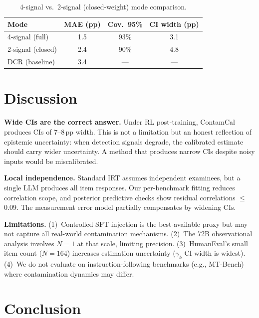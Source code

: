 \documentclass[letterpaper]{article}
\begin{document}
\begin{table}[t]
\centering
\caption{4-signal vs.\ 2-signal (closed-weight) mode comparison.}
\label{tab:2signal}
\begin{tabular}{lccc}
\toprule
Mode & MAE (pp) & Cov.\ 95\% & CI width (pp) \\
\midrule
4-signal (full) & 1.5 & 93\% & 3.1 \\
2-signal (closed) & 2.4 & 90\% & 4.8 \\
\midrule
DCR (baseline) & 3.4 & --- & --- \\
\bottomrule
\end{tabular}
\end{table}

\section{Discussion}
\label{sec:discussion}

\textbf{Wide CIs are the correct answer.}
Under RL post-training, ContamCal produces CIs of 7--8\,pp width.
This is not a limitation but an honest reflection of epistemic uncertainty: when detection signals degrade, the calibrated estimate should carry wider uncertainty.
A method that produces narrow CIs despite noisy inputs would be miscalibrated.

\textbf{Local independence.}
Standard IRT assumes independent examinees, but a single LLM produces all item responses.
Our per-benchmark fitting reduces correlation scope, and posterior predictive checks show residual correlations $\leq$0.09.
The measurement error model partially compensates by widening CIs.

\textbf{Limitations.}
(1)~Controlled SFT injection is the best-available proxy but may not capture all real-world contamination mechanisms.
(2)~The 72B observational analysis involves $N=1$ at that scale, limiting precision.
(3)~HumanEval's small item count ($N=164$) increases estimation uncertainty ($\gamma_k$ CI width is widest).
(4)~We do not evaluate on instruction-following benchmarks (e.g., MT-Bench) where contamination dynamics may differ.

\section{Conclusion}
\label{sec:conclusion}
\end{document}

